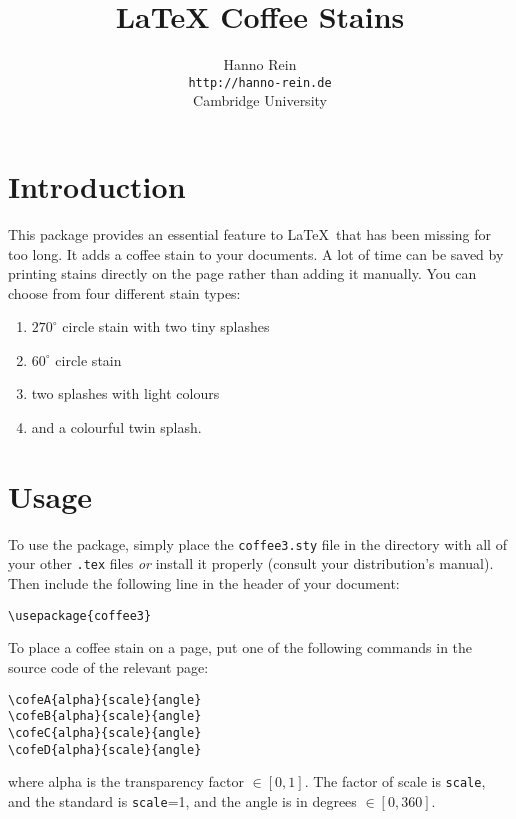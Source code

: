 \documentclass{article}
\begin{document}
\title{LaTeX Coffee Stains}
\author{Hanno Rein\\
\texttt{http://hanno-rein.de}\\
Cambridge University}
\renewcommand{\today}{April 3, 2009}
\maketitle

%
%

 
\section{Introduction}
This package provides an essential feature to \LaTeX~that has been missing for too long. It adds a coffee stain to your documents. A lot of time can be saved by printing stains directly on the page rather than adding it manually. You can choose from four different stain types:
\begin{enumerate}
  \item $270^\circ$ circle stain with two tiny splashes 
  \item $60^\circ$ circle stain 
  \item two splashes with light colours
  \item and a colourful twin splash.
\end{enumerate}

\section{Usage}
To use the package, simply place the \texttt{coffee3.sty} file in the directory with all of your 
other \texttt{.tex} files \textit{or} install it properly (consult your distribution's manual). 
Then include the following line in the header of your document:
\begin{verbatim}
\usepackage{coffee3}
\end{verbatim}
To place a coffee stain on a page, put one of the following commands in the source code of the relevant page: 
\begin{verbatim}
\cofeA{alpha}{scale}{angle}
\cofeB{alpha}{scale}{angle}
\cofeC{alpha}{scale}{angle}
\cofeD{alpha}{scale}{angle}
\end{verbatim}
where alpha is the transparency factor $\in [0,1]$. The factor of scale is {\tt scale}, and the standard is {\tt scale}=1, 
and the angle is in degrees $\in [0,360]$. 
\end{document}
